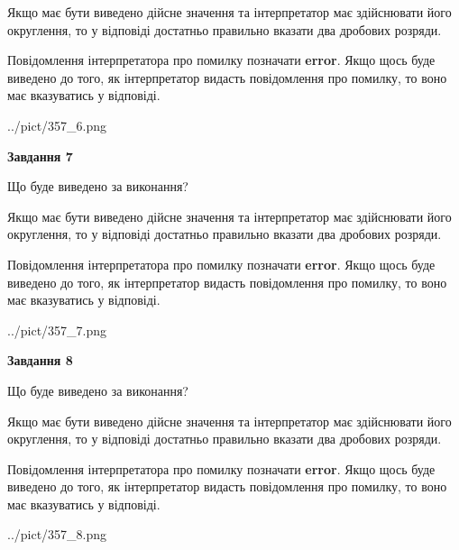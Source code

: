 \documentclass[12pt, ukrainian]{article}
\begin{document}
{\begin {Large}
Якщо має бути виведено дійсне значення та інтерпретатор має здійснювати його округлення, 
то у відповіді достатньо правильно вказати два дробових розряди.

Повідомлення інтерпретатора про помилку позначати \textbf{error}.
Якщо щось буде виведено до того, як інтерпретатор видасть повідомлення про помилку, 
то воно має вказуватись у відповіді. \par

\begin{center}
	{../pict/357_6.png}
\end{center}
\newpage

{\begin {center}\textbf{Завдання 7}\end {center}}\par
Що буде виведено за виконання? \par

Якщо має бути виведено дійсне значення та інтерпретатор має здійснювати його округлення, 
то у відповіді достатньо правильно вказати два дробових розряди.

Повідомлення інтерпретатора про помилку позначати \textbf{error}.
Якщо щось буде виведено до того, як інтерпретатор видасть повідомлення про помилку, 
то воно має вказуватись у відповіді. \par

\begin{center}
	{../pict/357_7.png}
\end{center}
\newpage

{\begin {center}\textbf{Завдання 8}\end {center}}\par
Що буде виведено за виконання? \par

Якщо має бути виведено дійсне значення та інтерпретатор має здійснювати його округлення, 
то у відповіді достатньо правильно вказати два дробових розряди.

Повідомлення інтерпретатора про помилку позначати \textbf{error}.
Якщо щось буде виведено до того, як інтерпретатор видасть повідомлення про помилку, 
то воно має вказуватись у відповіді. \par

\begin{center}
	{../pict/357_8.png}
\end{center}
\newpage


\end{Large}}
\end{document}
